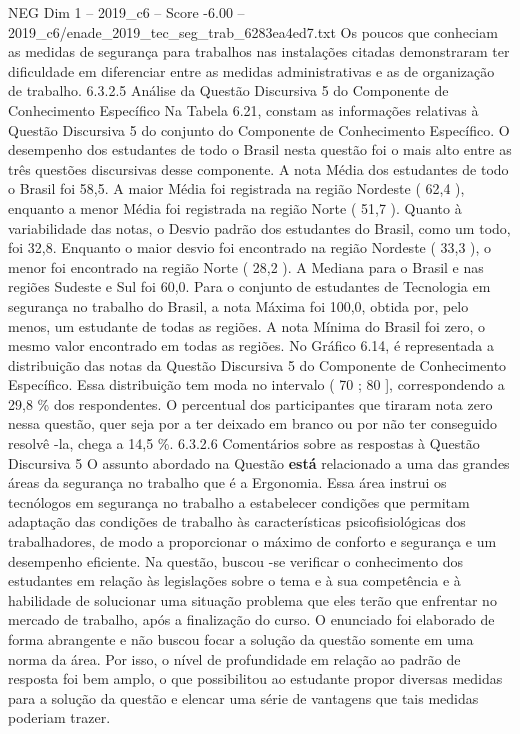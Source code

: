 \begin{textsample}{NEG Dim 1 – 2019\_c6 – Score -6.00 – 2019\_c6/enade\_2019\_tec\_seg\_trab\_6283ea4ed7.txt}
Os poucos que conheciam as medidas de segurança para trabalhos nas instalações citadas demonstraram ter dificuldade em diferenciar entre as medidas administrativas e as de organização de trabalho. 6.3.2.5 Análise da Questão Discursiva 5 do Componente de Conhecimento Específico Na Tabela 6.21, constam as informações relativas à Questão Discursiva 5 do conjunto do Componente de Conhecimento Específico.
O desempenho dos estudantes de todo o Brasil nesta questão foi o mais alto entre as três questões discursivas desse componente.
A nota Média dos estudantes de todo o Brasil foi 58,5.
A maior Média foi registrada na região Nordeste ( 62,4 ), enquanto a menor Média foi registrada na região Norte ( 51,7 ).
Quanto à variabilidade das notas, o Desvio padrão dos estudantes do Brasil, como um todo, foi 32,8.
Enquanto o maior desvio foi encontrado na região Nordeste ( 33,3 ), o menor foi encontrado na região Norte ( 28,2 ).
A Mediana para o Brasil e nas regiões Sudeste e Sul foi 60,0.
Para o conjunto de estudantes de Tecnologia em segurança no trabalho do Brasil, a nota Máxima foi 100,0, obtida por, pelo menos, um estudante de todas as regiões.
A nota Mínima do Brasil foi zero, o mesmo valor encontrado em todas as regiões.
No Gráfico 6.14, é representada a distribuição das notas da Questão Discursiva 5 do Componente de Conhecimento Específico.
Essa distribuição tem moda no intervalo ( 70 ; 80 ], correspondendo a 29,8 \% dos respondentes.
O percentual dos participantes que tiraram nota zero nessa questão, quer seja por a ter deixado em branco ou por não ter conseguido resolvê -la, chega a 14,5 \%. 6.3.2.6 Comentários sobre as respostas à Questão Discursiva 5 O assunto abordado na Questão \textbf{está} relacionado a uma das grandes áreas da segurança no trabalho que é a Ergonomia.
Essa área instrui os tecnólogos em segurança no trabalho a estabelecer condições que permitam adaptação das condições de trabalho às características psicofisiológicas dos trabalhadores, de modo a proporcionar o máximo de conforto e segurança e um desempenho eficiente.
Na questão, buscou -se verificar o conhecimento dos estudantes em relação às legislações sobre o tema e à sua competência e à habilidade de solucionar uma situação problema que eles terão que enfrentar no mercado de trabalho, após a finalização do curso.
O enunciado foi elaborado de forma abrangente e não buscou focar a solução da questão somente em uma norma da área.
Por isso, o nível de profundidade em relação ao padrão de resposta foi bem amplo, o que possibilitou ao estudante propor diversas medidas para a solução da questão e elencar uma série de vantagens que tais medidas poderiam trazer.

\end{textsample}
